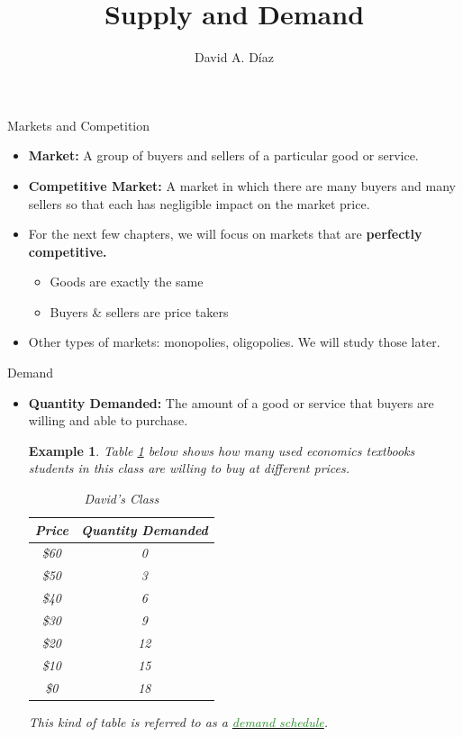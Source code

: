 \documentclass[xcolor={dvipsnames},pdf, hyperref={colorlinks=true, citecolor=ForestGreen, linkcolor=BlueViolet, urlcolor=Magenta}]{beamer}
\title{Supply and Demand}
\author{David A. D\'iaz}
\institute{UNC Chapel Hill}
\date{}
\newtheorem{exmp}{Example}[section]
\theoremstyle{definition}
\newcommand{\defn}[1]{\textbf{#1}}
\newcommand{\dd}[1]{{\underline{\textcolor{ForestGreen}{#1}}}}
\begin{document}
 
	
	\begin{frame}
		
		\titlepage
		
	\end{frame}
	
\begin{frame}{Markets and Competition}
	\begin{itemize}
		\item \defn{Market:} A group of buyers and sellers of a particular good or service.
		
		\item \defn{Competitive Market:} A market in which there are many buyers and many sellers so that each has negligible impact on the market price.
		
		\item For the next few chapters, we will focus on markets that are \textbf{perfectly competitive.} 
		\begin{itemize}
			\item Goods are exactly the same 
			\item Buyers \& sellers are price takers 
		\end{itemize}
		\item Other types of markets: monopolies, oligopolies. We will study those later.
	\end{itemize}
\end{frame}

\begin{frame}{Demand}
	
	\begin{itemize}
		\item \defn{Quantity Demanded:} The amount of a good or service that buyers are willing and able to purchase.
		
		\begin{exmp}
			\small
			Table \ref{tab11} below shows how many used economics textbooks students in this class are willing to buy at different prices.
			\begin{table}[ht]
				\caption{David's Class}
				\label{tab11}
				\centering
				\begin{tabular}{  c| c}        
					
					Price   & Quantity Demanded \\
					\hline
					\$60 & 0 \\
					\$50 & 3 \\
					\$40 & 6 \\
					\$30 & 9 \\
					\$20& 12 \\
					\$10 & 15 \\
					\$0 & 18 \\
				\end{tabular}
			\end{table} 
			
			This kind of table is referred to as a \dd{demand schedule}.
		\end{exmp}
	\end{itemize}


\end{frame}
\end{document}
